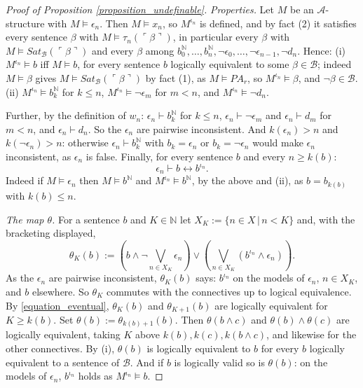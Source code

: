\documentclass{amsart}  %
\numberwithin{equation}{section}
\theoremstyle{definition}
\theoremstyle{remark}
\begin{document}
\begin{proof} [Proof of Proposition \ref{proposition_undefinable}]
\emph{Properties.} Let $M$ be an $\mathcal{A}$-structure with $M \models \epsilon _{n}$. Then $M \models x _{n}$, so $M ^{\iota _{n}}$ is defined, and by fact (2) it satisfies every sentence $\beta$ with $M \models \tau _{n} (\ulcorner \beta \urcorner)$, in particular every $\beta$ with $M \models Sat _{\mathcal{B}} (\ulcorner \beta \urcorner)$ and every $\beta$ among $b _{0} ^{\mathbb{N}}, \ldots, b _{n} ^{\mathbb{N}}, \neg \epsilon _{0}, \ldots, \neg \epsilon _{n-1}, \neg d _{n}$. Hence: (i) $M ^{\iota _{n}} \models b$ iff $M \models b$, for every sentence $b$ logically equivalent to some $\beta \in \mathcal{B}$; indeed $M \models \beta$ gives $M \models Sat _{\mathcal{B}} (\ulcorner \beta \urcorner)$ by fact (1), as $M \models PA _{r}$, so $M ^{\iota _{n}} \models \beta$, and $\neg \beta \in \mathcal{B}$. (ii) $M ^{\iota _{n}} \models b _{k} ^{\mathbb{N}}$ for $k \leq n$, $M ^{\iota _{n}} \models \neg \epsilon _{m}$ for $m < n$, and $M ^{\iota _{n}} \models \neg d _{n}$.

Further, by the definition of $w _{n}$: $\epsilon _{n} \vdash b _{k} ^{\mathbb{N}}$ for $k \leq n$, $\epsilon _{n} \vdash \neg \epsilon _{m}$ and $\epsilon _{n} \vdash d _{m}$ for $m < n$, and $\epsilon _{n} \vdash d _{n}$. So the $\epsilon _{n}$ are pairwise inconsistent. And $k (\epsilon _{n}) > n$ and $k (\neg \epsilon _{n}) > n$: otherwise $\epsilon _{n} \vdash b _{k} ^{\mathbb{N}}$ with $b _{k} = \epsilon _{n}$ or $b _{k} = \neg \epsilon _{n}$ would make $\epsilon _{n}$ inconsistent, as $\epsilon _{n}$ is false. Finally, for every sentence $b$ and every $n \geq k (b)$:
\begin{equation} \label{equation_eventual}
\epsilon _{n} \vdash b \leftrightarrow b ^{\iota _{n}}.
\end{equation}
Indeed if $M \models \epsilon _{n}$ then $M \models b ^{\mathbb{N}}$ and $M ^{\iota _{n}} \models b ^{\mathbb{N}}$, by the above and (ii), as $b = b _{k (b)}$ with $k (b) \leq n$.

\emph{The map $\theta$.} For a sentence $b$ and $K \in \mathbb{N}$ let $X _{K} := \{n \in X \,|\, n < K\}$ and, with the bracketing displayed,
$$\theta _{K} (b) := \left( b \land \neg \bigvee _{n \in X _{K}} \epsilon _{n} \right) \lor \left( \bigvee _{n \in X _{K}} \left( b ^{\iota _{n}} \land \epsilon _{n} \right) \right).$$
As the $\epsilon _{n}$ are pairwise inconsistent, $\theta _{K} (b)$ says: $b ^{\iota _{n}}$ on the models of $\epsilon _{n}$, $n \in X _{K}$, and $b$ elsewhere. So $\theta _{K}$ commutes with the connectives up to logical equivalence. By \eqref{equation_eventual}, $\theta _{K} (b)$ and $\theta _{K+1} (b)$ are logically equivalent for $K \geq k (b)$. Set $\theta (b) := \theta _{k (b) + 1} (b)$. Then $\theta (b \land c)$ and $\theta (b) \land \theta (c)$ are logically equivalent, taking $K$ above $k (b), k (c), k (b \land c)$, and likewise for the other connectives. By (i), $\theta (b)$ is logically equivalent to $b$ for every $b$ logically equivalent to a sentence of $\mathcal{B}$. And if $b$ is logically valid so is $\theta (b)$: on the models of $\epsilon _{n}$, $b ^{\iota _{n}}$ holds as $M ^{\iota _{n}} \models b$.


\end{proof}
\end{document}
